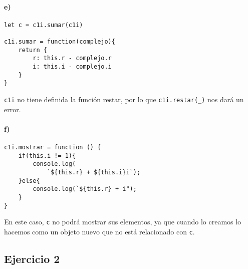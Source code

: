 \documentclass[10pt,a4paper]{article}
\begin{document}
\begin{multicols}{2}

\paragraph{e)}
\begin{centrado2}
\begin{verbatim}
let c = c1i.sumar(c1i)

c1i.sumar = function(complejo){
    return {
        r: this.r - complejo.r
        i: this.i - complejo.i
    }
}
\end{verbatim}
\end{centrado2}
\texttt{c1i} no tiene definida la función restar, por lo que \texttt{c1i.restar(\_)} nos dará un error.
\vfill\null
\columnbreak
\paragraph{f)}
\begin{verbatim}
c1i.mostrar = function () {
    if(this.i != 1){
        console.log(
            `${this.r} + ${this.i}i`);
    }else{
        console.log(`${this.r} + i");
    }
}
\end{verbatim}

En este caso, \texttt{c} no podrá mostrar sus elementos, ya que cuando lo creamos lo hacemos como un objeto nuevo que no está relacionado con \texttt{c}.

\end{multicols}

\newpage
\subsection{Ejercicio 2}
\end{document}

